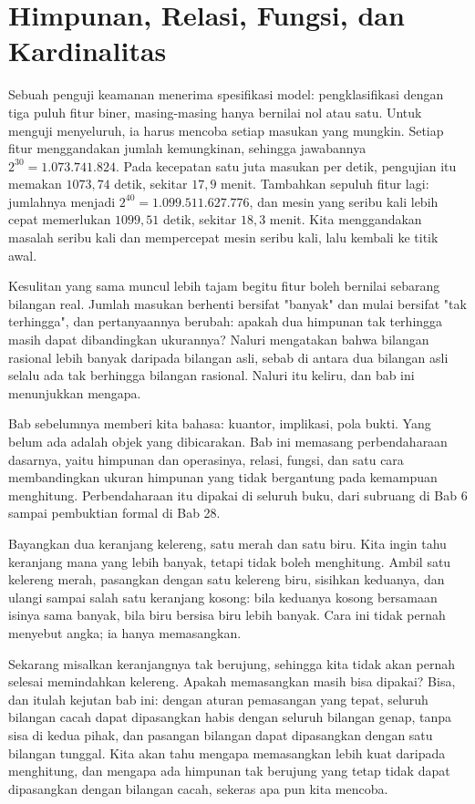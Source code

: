 \chapter{Himpunan, Relasi, Fungsi, dan Kardinalitas}

Sebuah penguji keamanan menerima spesifikasi model: pengklasifikasi dengan tiga puluh
fitur biner, masing-masing hanya bernilai nol atau satu. Untuk menguji menyeluruh, ia
harus mencoba setiap masukan yang mungkin. Setiap fitur menggandakan jumlah
kemungkinan, sehingga jawabannya $2^{30} = 1.073.741.824$. Pada kecepatan satu juta
masukan per detik, pengujian itu memakan $1073{,}74$ detik, sekitar $17{,}9$ menit.
Tambahkan sepuluh fitur lagi: jumlahnya menjadi $2^{40} = 1.099.511.627.776$, dan
mesin yang seribu kali lebih cepat memerlukan $1099{,}51$ detik, sekitar $18{,}3$
menit. Kita menggandakan masalah seribu kali dan mempercepat mesin seribu kali, lalu
kembali ke titik awal.

Kesulitan yang sama muncul lebih tajam begitu fitur boleh bernilai sebarang bilangan
real. Jumlah masukan berhenti bersifat "banyak" dan mulai bersifat "tak terhingga",
dan pertanyaannya berubah: apakah dua himpunan tak terhingga masih dapat dibandingkan
ukurannya? Naluri mengatakan bahwa bilangan rasional lebih banyak daripada bilangan
asli, sebab di antara dua bilangan asli selalu ada tak berhingga bilangan rasional.
Naluri itu keliru, dan bab ini menunjukkan mengapa.

Bab sebelumnya memberi kita bahasa: kuantor, implikasi, pola bukti. Yang belum ada
adalah objek yang dibicarakan. Bab ini memasang perbendaharaan dasarnya, yaitu
himpunan dan operasinya, relasi, fungsi, dan satu cara membandingkan ukuran himpunan
yang tidak bergantung pada kemampuan menghitung. Perbendaharaan itu dipakai di
seluruh buku, dari subruang di Bab 6 sampai pembuktian formal di Bab 28.

\begin{untukanak}
Bayangkan dua keranjang kelereng, satu merah dan satu biru. Kita ingin tahu keranjang
mana yang lebih banyak, tetapi tidak boleh menghitung. Ambil satu kelereng merah,
pasangkan dengan satu kelereng biru, sisihkan keduanya, dan ulangi sampai salah satu
keranjang kosong: bila keduanya kosong bersamaan isinya sama banyak, bila biru bersisa
biru lebih banyak. Cara ini tidak pernah menyebut angka; ia hanya memasangkan.

Sekarang misalkan keranjangnya tak berujung, sehingga kita tidak akan pernah selesai
memindahkan kelereng. Apakah memasangkan masih bisa dipakai? Bisa, dan itulah kejutan
bab ini: dengan aturan pemasangan yang tepat, seluruh bilangan cacah dapat dipasangkan
habis dengan seluruh bilangan genap, tanpa sisa di kedua pihak, dan pasangan bilangan
dapat dipasangkan dengan satu bilangan tunggal. Kita akan tahu mengapa memasangkan
lebih kuat daripada menghitung, dan mengapa ada himpunan tak berujung yang tetap tidak
dapat dipasangkan dengan bilangan cacah, sekeras apa pun kita mencoba.
\end{untukanak}

